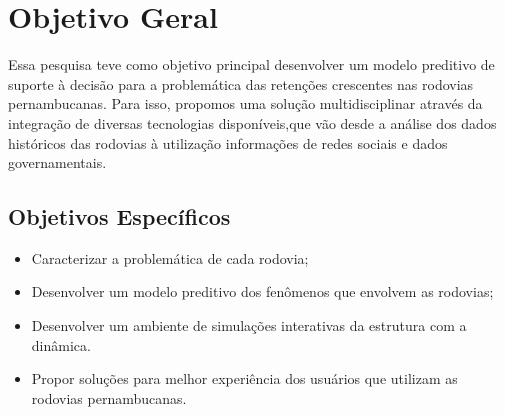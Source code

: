 \section{ Objetivo Geral}\label{intro:objetivo}

Essa pesquisa teve como objetivo principal desenvolver um modelo preditivo de suporte à decisão para a problemática das retenções crescentes nas rodovias pernambucanas. 
Para isso, propomos uma solução multidisciplinar através da integração de diversas tecnologias disponíveis,que vão desde a análise dos dados históricos das 
rodovias à utilização informações de redes sociais e dados governamentais.

\subsection{ Objetivos Específicos}\label{intro:especificos}

\begin{itemize}
 \item Caracterizar a problemática de cada rodovia; 
 \item Desenvolver um modelo preditivo dos fenômenos que envolvem as rodovias;
 \item Desenvolver um ambiente de simulações interativas da estrutura com a dinâmica.
 \item Propor soluções para melhor experiência dos usuários que utilizam as rodovias pernambucanas.
\end{itemize}










